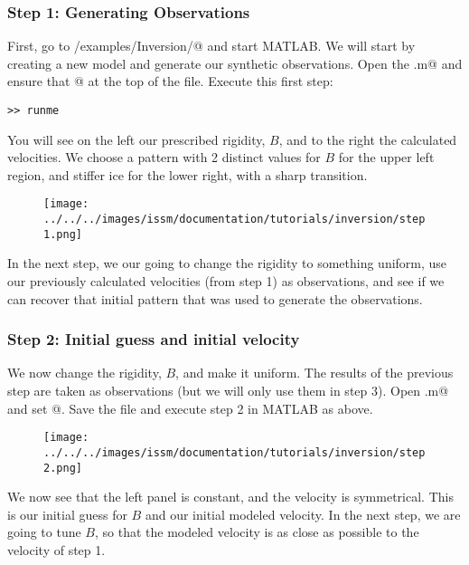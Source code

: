 \subsubsection{Step 1: Generating Observations}
First, go to \verb@trunk/examples/Inversion/@ and start MATLAB. We will start by creating a new model and generate our synthetic observations.  Open the \verb@runme.m@ and ensure that @ at the top of the file. Execute this first step:
\begin{verbatim}>> runme\end{verbatim}
You will see on the left our prescribed rigidity, $B$, and to the right the calculated velocities. We choose a pattern with 2 distinct values for $B$ for the upper left region, and stiffer ice for the lower right, with a sharp transition.
\begin{figure}[H]
	\begin{center}
		\texttt{[image: ../../../images/issm/documentation/tutorials/inversion/step1.png]}
	\end{center}
\end{figure}
In the next step, we our going to change the rigidity to something uniform, use our previously calculated velocities (from step 1) as observations, and see if we can recover that initial pattern that was used to generate the observations.

\subsubsection{Step 2: Initial guess and initial velocity}
We now change the rigidity, $B$, and make it uniform. The results of the previous step are taken as observations (but we will only use them in step 3). Open \verb@runme.m@ and set @. Save the file and execute step 2 in MATLAB as above.
\begin{figure}[H]
	\begin{center}
		\texttt{[image: ../../../images/issm/documentation/tutorials/inversion/step2.png]}
	\end{center}
\end{figure}
We now see that the left panel is constant, and the velocity is symmetrical. This is our initial guess for $B$ and our initial modeled velocity. In the next step, we are going to tune $B$, so that the modeled velocity is as close as possible to the velocity of step 1.

